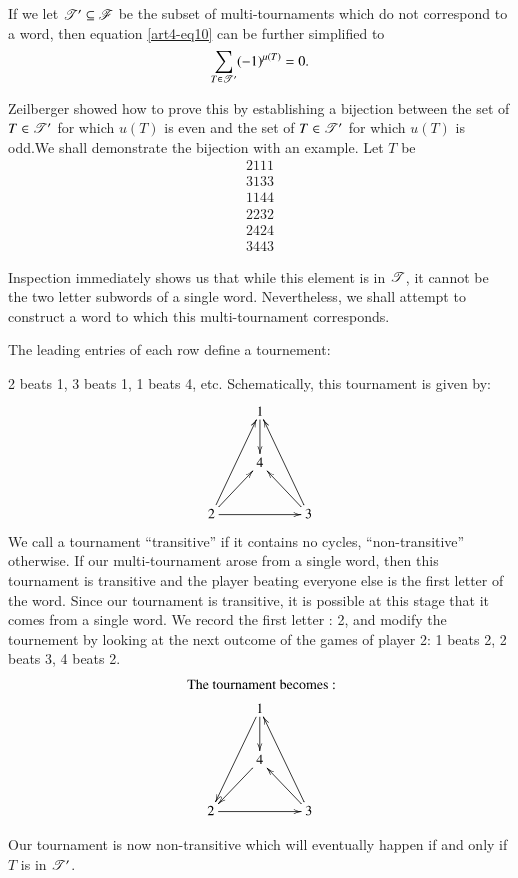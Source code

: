 If we let $\mathscr{T}' \subseteq \mathscr{F}$ be the subset of multi-tournaments which do not correspond to a word, then equation \eqref{art4-eq10} can be further simplified to
\begin{equation}
\sum\limits_{T \in \mathscr{T}'} (-1)^{\mu(T)} = 0. \label{art4-eq11}
\end{equation}

Zeilberger showed how to prove this by establishing a bijection between the set of $T \in \mathscr{T}'$ for which $u(T)$ is even and the set of $T \in \mathscr{T}'$ for which $u(T)$ is odd.\pageoriginale We shall demonstrate the bijection with an example. Let $T$ be 
\begin{align*}
2111\\
3133\\
1144\\
2232\\
2424\\
3443
\end{align*}

Inspection immediately shows us that while this element is in $\mathscr{T}$, it cannot be the two letter subwords of a single word. Nevertheless, we shall attempt to construct a word to which this multi-tournament corresponds.

The leading entries of each row define a tournement:

2 beats 1, 3 beats 1, 1 beats 4, etc. Schematically, this tournament is given by:
$$
\xymatrix{
& 1\ar[d] & \\
& 4 & \\
2\ar[uur] \ar[ur]\ar[rr] & & 3 \ar[uul]\ar[ul]
}
$$
We call a tournament ``transitive'' if it contains no cycles, ``non-transi\-tive'' otherwise. If our multi-tournament arose from a single word, then this tournament is transitive and the player beating everyone else is the first letter of the word. Since our tournament is transitive, it is possible at this stage that it comes from a single word. We record the first letter : 2, and modify the tournement by looking at the next outcome of the games of player 2: 1 beats 2, 2 beats 3, 4 beats 2.
\begin{gather*}
\text{ The tournament becomes :}\\
\xymatrix{
& 1\ar[d] \ar[ddl] & \\
& 4\ar[dl] & \\
2\ar[rr] & & 3 \ar[uul]\ar[ul]
}
\end{gather*}

Our tournament is now non-transitive which will eventually happen if and only if $T$ is in $\mathscr{T}'$.

